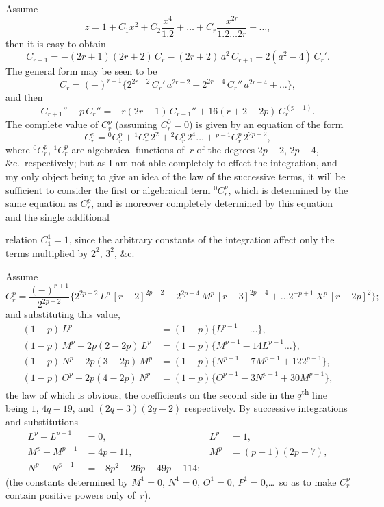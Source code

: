\documentclass[11pt,a4paper]{article}
\begin{document}
Assume
\[
z = 1 + C_1 x^2 + C_2 \frac{x^4}{1.2} + \ldots + C_r \frac{x^{2r}}{1.2\ldots 2r} + \ldots,
\]
then it is easy to obtain
\[
C_{r+1} = -(2r+1)(2r+2)\,C_r - (2r+2)\,a^2\,C_{r+1} + 2(a^2-4)\,C_r'.
\]
The general form may be seen to be
\[
C_r = (-)^{r+1}\{2^{2r-2}\,C_r'\,a^{2r-2} + 2^{2r-4}\,C_r''\,a^{2r-4} + \ldots\},
\]
and then
\[
C_{r+1}'' - p\,C_r'' = -r(2r-1)\,C_{r-1}'' + 16(r+2-2p)\,C_r^{(p-1)}.
\]
The complete value of $C_r^p$ (assuming $C_r^0 = 0$) is given by an equation of the form
\[
C_r^p = {}^0C_r^p + {}^1C_r^p\,2^2 + {}^2C_r^p\,2^4 \ldots + {}^{p-1}C_r^p\,2^{2p-2},
\]
where ${}^0C_r^p$, ${}^1C_r^p$ are algebraical functions of~$r$ of the degrees $2p-2$, $2p-4$, \&c.\ respectively; but as I am not able completely to effect the integration, and my only object being to give an idea of the law of the successive terms, it will be sufficient to consider the first or algebraical term ${}^0C_r^p$, which is determined by the same equation as $C_r^p$, and is moreover completely determined by this equation and the single additional

\newpage
relation $C_1^1 = 1$, since the arbitrary constants of the integration affect only the terms multiplied by $2^2$, $3^2$, \&c.

Assume
\[
C_r^p = \frac{(-)^{r+1}}{2^{2p-2}}\{2^{2p-2}\,L^p\,[r-2]^{2p-2} + 2^{2p-4}\,M^p\,[r-3]^{2p-4} + \ldots 2^{-p+1}\,X^p\,[r-2p]^2\};
\]
and substituting this value,
\begin{align*}
(1-p)\,L^p &= (1-p)\{L^{p-1} - \ldots\},\\
(1-p)\,M^p - 2p(2-2p)\,L^p &= (1-p)\{M^{p-1} - 14L^{p-1}\ldots\},\\
(1-p)\,N^p - 2p(3-2p)\,M^p &= (1-p)\{N^{p-1} - 7M^{p-1} + 122^{p-1}\},\\
(1-p)\,O^p - 2p(4-2p)\,N^p &= (1-p)\{O^{p-1} - 3N^{p-1} + 30M^{p-1}\},
\end{align*}
the law of which is obvious, the coefficients on the second side in the $q$\textsuperscript{th} line being $1$, $4q-19$, and $(2q-3)(2q-2)$ respectively. By successive integrations and substitutions
\begin{align*}
L^p - L^{p-1} &= 0, & L^p &= 1,\\
M^p - M^{p-1} &= 4p-11, & M^p &= (p-1)(2p-7),\\
N^p - N^{p-1} &= -8p^2 + 26p + 49p - 114;
\end{align*}
(the constants determined by $M^1 = 0$, $N^1 = 0$, $O^1 = 0$, $P^1 = 0$,\ldots\ so as to make $C_r^p$ contain positive powers only of~$r$).
\end{document}
